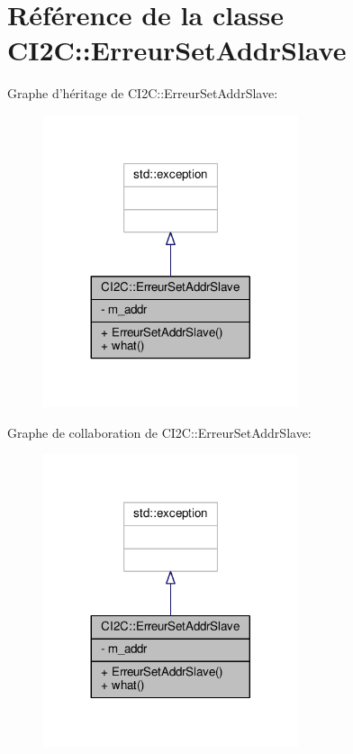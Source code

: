 \hypertarget{classCI2C_1_1ErreurSetAddrSlave}{\section{Référence de la classe C\+I2\+C\+:\+:Erreur\+Set\+Addr\+Slave}
\label{classCI2C_1_1ErreurSetAddrSlave}
}


Graphe d'héritage de C\+I2\+C\+:\+:Erreur\+Set\+Addr\+Slave\+:
\nopagebreak
\begin{figure}[H]
\begin{center}
\leavevmode
\includegraphics[width=212pt]{classCI2C_1_1ErreurSetAddrSlave__inherit__graph}
\end{center}
\end{figure}


Graphe de collaboration de C\+I2\+C\+:\+:Erreur\+Set\+Addr\+Slave\+:
\nopagebreak
\begin{figure}[H]
\begin{center}
\leavevmode
\includegraphics[width=212pt]{classCI2C_1_1ErreurSetAddrSlave__coll__graph}
\end{center}
\end{figure}
